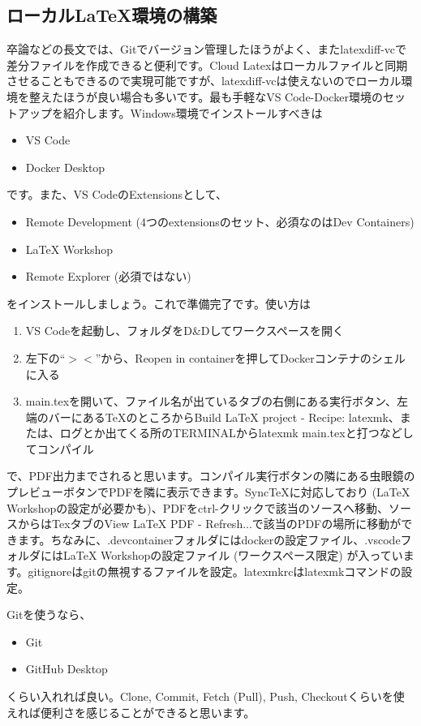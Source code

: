 \documentclass[uplatex,dvipdfmx,a4j,12pt,twocolumn]{jsarticle}
\begin{document}
\subsection{ローカル\LaTeX 環境の構築}
卒論などの長文では、Gitでバージョン管理したほうがよく、またlatexdiff-vcで差分ファイルを作成できると便利です。Cloud Latexはローカルファイルと同期させることもできるので実現可能ですが、latexdiff-vcは使えないのでローカル環境を整えたほうが良い場合も多いです。最も手軽なVS Code-Docker環境のセットアップを紹介します。Windows環境でインストールすべきは
\begin{itemize}
  \item VS Code
  \item Docker Desktop
\end{itemize}
です。また、VS CodeのExtensionsとして、
\begin{itemize}
  \item Remote Development (4つのextensionsのセット、必須なのはDev Containers)
  \item LaTeX Workshop
  \item Remote Explorer (必須ではない)
\end{itemize}
をインストールしましょう。これで準備完了です。使い方は
\begin{enumerate}
  \item VS Codeを起動し、フォルダをD\&Dしてワークスペースを開く
  \item 左下の``$><$''から、Reopen in containerを押してDockerコンテナのシェルに入る
  \item main.texを開いて、ファイル名が出ているタブの右側にある実行ボタン、左端のバーにある\TeX のところからBuild LaTeX project - Recipe: latexmk、または、ログとか出てくる所のTERMINALからlatexmk main.texと打つなどしてコンパイル
\end{enumerate}
で、PDF出力までされると思います。コンパイル実行ボタンの隣にある虫眼鏡のプレビューボタンでPDFを隣に表示できます。SyncTeXに対応しており (LaTeX Workshopの設定が必要かも)、PDFをctrl-クリックで該当のソースへ移動、ソースからはTexタブのView LaTeX PDF - Refresh...で該当のPDFの場所に移動ができます。ちなみに、.devcontainerフォルダにはdockerの設定ファイル、.vscodeフォルダにはLaTeX Workshopの設定ファイル (ワークスペース限定) が入っています。gitignoreはgitの無視するファイルを設定。latexmkrcはlatexmkコマンドの設定。

Gitを使うなら、
\begin{itemize}
  \item Git
  \item GitHub Desktop
\end{itemize}
くらい入れれば良い。Clone, Commit, Fetch (Pull), Push, Checkoutくらいを使えれば便利さを感じることができると思います。
\end{document}
